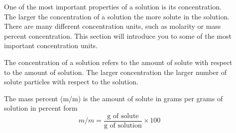 \documentclass[main.tex]{subfiles} %
\begin{document}
\begin{description}
     \item[]                       
One of the most important properties of a solution is its concentration. The larger the concentration of a solution the more solute in the solution. There are many different concentration units, such as molarity or mass percent concentration. This section will introduce you to some of the most important concentration units.
\item[] The concentration of a solution refers to the amount of solute with respect to the amount of solution. The larger concentration the larger number of solute particles with respect to the solution. 
\item[] The mass percent (m/m) is the amount of solute in grams per grams of solution in percent form
\begin{equation*}
\boxed{ m/m=\frac{\text{g of solute}}{\text{g of solution}}\times 100}   
\end{equation*}








\end{description}
\end{document}
